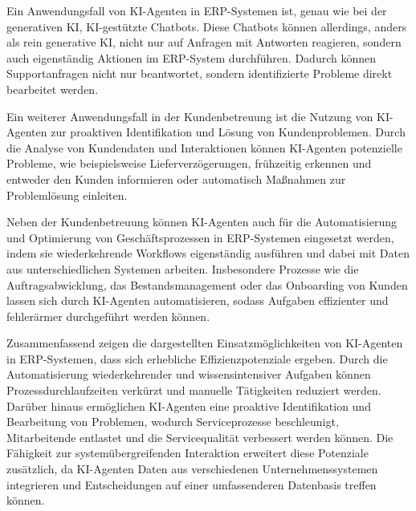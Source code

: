 Ein Anwendungsfall von \ac{KI}-Agenten in \ac{ERP}-Systemen ist, genau wie bei der generativen \ac{KI}, \ac{KI}-gestützte Chatbots. Diese Chatbots können allerdings, anders als rein generative \ac{KI}, nicht nur auf Anfragen mit Antworten reagieren, sondern auch eigenständig Aktionen im \ac{ERP}-System durchführen. Dadurch können Supportanfragen nicht nur beantwortet, sondern identifizierte Probleme direkt bearbeitet werden. \cite[]{gujar_role_2025} 

Ein weiterer Anwendungsfall in der Kundenbetreuung ist die Nutzung von \ac{KI}-Agenten zur proaktiven Identifikation und Lösung von Kundenproblemen. Durch die Analyse von Kundendaten und Interaktionen können \ac{KI}-Agenten potenzielle Probleme, wie beispielsweise Lieferverzögerungen, frühzeitig erkennen und entweder den Kunden informieren oder automatisch Maßnahmen zur Problemlösung einleiten. \cite[]{gujar_role_2025}

Neben der Kundenbetreuung können \ac{KI}-Agenten auch für die Automatisierung und Optimierung von Geschäftsprozessen in \ac{ERP}-Systemen eingesetzt werden, indem sie wiederkehrende Workflows eigenständig ausführen und dabei mit Daten aus unterschiedlichen Systemen arbeiten. Insbesondere Prozesse wie die Auftragsabwicklung, das Bestandsmanagement oder das Onboarding von Kunden lassen sich durch \ac{KI}-Agenten automatisieren, sodass Aufgaben effizienter und fehlerärmer durchgeführt werden können. \cite[]{gujar_role_2025}

Zusammenfassend zeigen die dargestellten Einsatzmöglichkeiten von \ac{KI}-Agenten in \ac{ERP}-Systemen, dass sich erhebliche Effizienzpotenziale ergeben. Durch die Automatisierung wiederkehrender und wissensintensiver Aufgaben können Prozessdurchlaufzeiten verkürzt und manuelle Tätigkeiten reduziert werden. Darüber hinaus ermöglichen \ac{KI}-Agenten eine proaktive Identifikation und Bearbeitung von Problemen, wodurch Serviceprozesse beschleunigt, Mitarbeitende entlastet und die Servicequalität verbessert werden können. \cite[\pagef 1032ff]{gujar_role_2025} Die Fähigkeit zur systemübergreifenden Interaktion erweitert diese Potenziale zusätzlich, da \ac{KI}-Agenten Daten aus verschiedenen Unternehmenssystemen integrieren und Entscheidungen auf einer umfassenderen Datenbasis treffen können. \cite[\pagef 8f]{sarferaz_implementing_2025-1}

